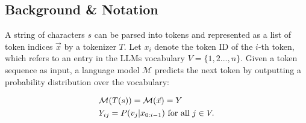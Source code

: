 \documentclass{article} %
\begin{document}
\subsection{Background \& Notation}
\label{sec:background}

A string of characters $s$ can be parsed into tokens and represented as a list of token indices $\vec x$ by a tokenizer $T$. 
Let $x_i$ denote the token ID of the $i$-th token, which refers to an entry in the LLMs vocabulary $V = \{1, 2..., n\}$.
Given a token sequence as input, a language model $\mathcal{M}$ predicts the next token by outputting a probability distribution over the vocabulary: 

\begin{equation}
    \begin{aligned} \ignorespacesafterend
    &\mathcal M(T(s)) = \mathcal M(\vec x) = Y \\
    &Y_{ij} = P(v_j | x_{0:i-1})  \text{ for all } j \in V.   
    \end{aligned}
\end{equation}
\end{document}
